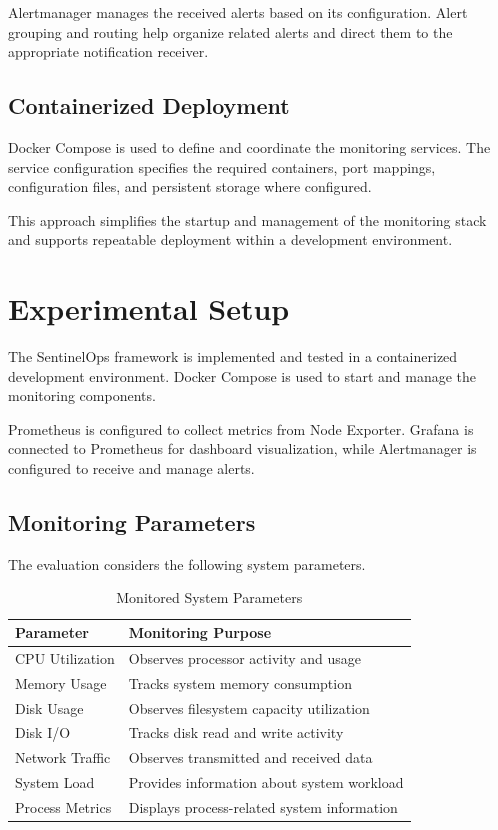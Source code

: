 \documentclass[conference]{IEEEtran}
\begin{document}
Alertmanager manages the received alerts based on its
configuration. Alert grouping and routing help organize
related alerts and direct them to the appropriate notification
receiver.

\subsection{Containerized Deployment}

Docker Compose is used to define and coordinate the monitoring
services. The service configuration specifies the required
containers, port mappings, configuration files, and persistent
storage where configured.

This approach simplifies the startup and management of the
monitoring stack and supports repeatable deployment within
a development environment.


\section{Experimental Setup}

The SentinelOps framework is implemented and tested in a
containerized development environment. Docker Compose is used
to start and manage the monitoring components.

Prometheus is configured to collect metrics from Node Exporter.
Grafana is connected to Prometheus for dashboard visualization,
while Alertmanager is configured to receive and manage alerts.

\subsection{Monitoring Parameters}

The evaluation considers the following system parameters.

\begin{table}[!t]
\caption{Monitored System Parameters}
\label{tab:metrics}
\centering
\footnotesize
\begin{tabular}{|p{2.0cm}|p{5.0cm}|}
\hline
\textbf{Parameter} & \textbf{Monitoring Purpose} \\
\hline
CPU Utilization & Observes processor activity and usage \\
\hline
Memory Usage & Tracks system memory consumption \\
\hline
Disk Usage & Observes filesystem capacity utilization \\
\hline
Disk I/O & Tracks disk read and write activity \\
\hline
Network Traffic & Observes transmitted and received data \\
\hline
System Load & Provides information about system workload \\
\hline
Process Metrics & Displays process-related system information \\
\hline
\end{tabular}
\end{table}
\end{document}
